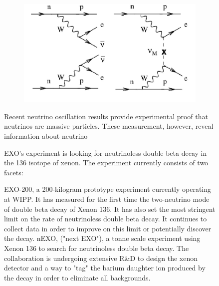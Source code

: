 \begin{figure}[!hbtp]
{{  \begin{figure}[!hbtp]
  \centering
  \includegraphics[totalheight=0.5\textwidth,trim=0cm 0cm 0cm 0cm, clip=true]{Pictures/blabla/beta.jpg}
  \label{fig:feyman}
  \end{figure}
  
  
  Recent neutrino oscillation results provide experimental proof that neutrinos 
  are massive particles. These measurement, however, reveal information about 
  neutrino 
  
  
EXO's experiment is looking for neutrinoless double beta decay in the 136 isotope of xenon. The experiment currently consists of 
  two facets:

    EXO-200, a 200-kilogram prototype experiment currently operating at WIPP. It has measured for the first time the two-neutrino mode 
    of double beta decay of Xenon 136. It has also set the most stringent limit on the rate of neutrinoless double beta decay. 
    It continues to collect data in order to improve on this limit or potentially discover the decay.
    nEXO, ("next EXO"), a tonne scale experiment using Xenon 136 to search for neutrinoless double beta decay. The collaboration is 
    undergoing extensive R&D to design the xenon detector and a way to "tag" the barium daughter ion produced by the decay in order 
    to eliminate all backgrounds.

}}
\end{figure}
